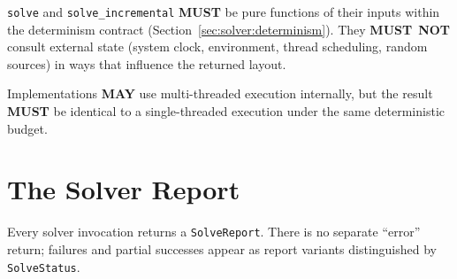 \documentclass[11pt,letterpaper]{report}
\newcounter{requirement}[chapter]
\newcommand{\MUST}{\textbf{MUST}}
\newcommand{\MUSTNOT}{\textbf{MUST}\nobreak\ \textbf{NOT}}
\newcommand{\MAY}{\textbf{MAY}}
\begin{document}
\begin{requirement}
  \label{req:solver:solver-purity}
  \texttt{solve} and \texttt{solve\_incremental} \MUST{} be pure
  functions of their inputs within the determinism contract
  (Section~\ref{sec:solver:determinism}). They \MUSTNOT{} consult
  external state (system clock, environment, thread scheduling,
  random sources) in ways that influence the returned layout.

  Implementations \MAY{} use multi-threaded execution internally,
  but the result \MUST{} be identical to a single-threaded
  execution under the same deterministic budget.
\end{requirement}

\section{The Solver Report}
\label{sec:solver:report}

Every solver invocation returns a \texttt{SolveReport}. There is no
separate ``error'' return; failures and partial successes appear
as report variants distinguished by \texttt{SolveStatus}.
\end{document}

